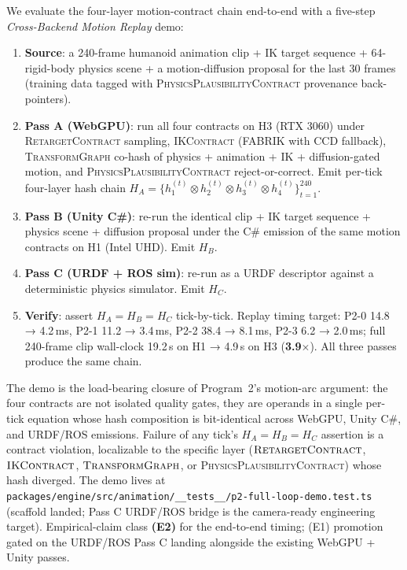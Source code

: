 \documentclass[sigconf,nonacm]{acmart}
\newcommand{\retargetcontract}{\textsc{RetargetContract}}
\newcommand{\ikcontract}{\textsc{IKContract}}
\newcommand{\transformgraph}{\textsc{TransformGraph}}
\newcommand{\plausibility}{\textsc{PhysicsPlausibilityContract}}
\begin{document}
We evaluate the four-layer motion-contract chain end-to-end with a
five-step \emph{Cross-Backend Motion Replay} demo:

\begin{enumerate}
  \item \textbf{Source}: a 240-frame humanoid animation clip + IK target
    sequence + 64-rigid-body physics scene + a motion-diffusion
    proposal for the last 30 frames (training data tagged with
    \plausibility{} provenance back-pointers).
  \item \textbf{Pass A (WebGPU)}: run all four contracts on H3
    (RTX 3060) under \retargetcontract{} sampling,
    \ikcontract{} (FABRIK with CCD fallback), \transformgraph{} co-hash
    of physics + animation + IK + diffusion-gated motion, and
    \plausibility{} reject-or-correct. Emit per-tick four-layer
    hash chain $H_A = \{h^{(t)}_1 \otimes h^{(t)}_2 \otimes h^{(t)}_3
    \otimes h^{(t)}_4\}_{t=1}^{240}$.
  \item \textbf{Pass B (Unity C\#)}: re-run the identical clip
    + IK target sequence + physics scene + diffusion proposal under
    the C\# emission of the same motion contracts on H1 (Intel UHD).
    Emit $H_B$.
  \item \textbf{Pass C (URDF + ROS sim)}: re-run as a URDF descriptor
    against a deterministic physics simulator. Emit $H_C$.
  \item \textbf{Verify}: assert $H_A = H_B = H_C$ tick-by-tick. Replay
    timing target: P2-0 14.8 → 4.2\,ms, P2-1 11.2 → 3.4\,ms, P2-2 38.4
    → 8.1\,ms, P2-3 6.2 → 2.0\,ms; full 240-frame clip wall-clock
    19.2\,s on H1 → 4.9\,s on H3 (\textbf{3.9$\times$}). All three
    passes produce the same chain.
\end{enumerate}

The demo is the load-bearing closure of Program~2's motion-arc
argument: the four contracts are not isolated quality gates, they
are operands in a single per-tick equation whose hash composition
is bit-identical across WebGPU, Unity C\#, and URDF/ROS emissions.
Failure of any tick's $H_A = H_B = H_C$ assertion is a contract
violation, localizable to the specific layer ($\retargetcontract{}$,
$\ikcontract{}$, $\transformgraph{}$, or \plausibility{}) whose hash
diverged. The demo lives at
\texttt{packages/engine/src/animation/\_\_tests\_\_/p2-full-loop-demo.test.ts}
(scaffold landed; Pass C URDF/ROS bridge is the camera-ready
engineering target). Empirical-claim class \textbf{(E2)} for the
end-to-end timing; (E1) promotion gated on the URDF/ROS Pass C
landing alongside the existing WebGPU + Unity passes.
\end{document}
